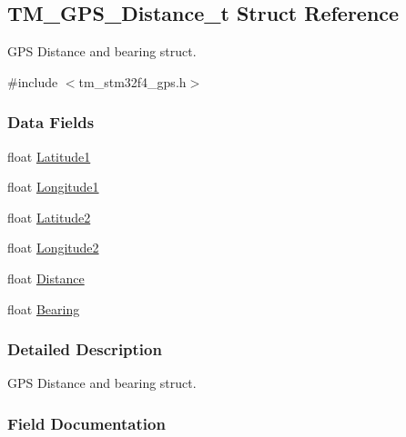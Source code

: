\hypertarget{struct_t_m___g_p_s___distance__t}{}\subsection{T\+M\+\_\+\+G\+P\+S\+\_\+\+Distance\+\_\+t Struct Reference}
\label{struct_t_m___g_p_s___distance__t}


G\+P\+S Distance and bearing struct.  




{\ttfamily \#include $<$tm\+\_\+stm32f4\+\_\+gps.\+h$>$}

\subsubsection*{Data Fields}
\begin{DoxyCompactItemize}
\item 
float \hyperlink{struct_t_m___g_p_s___distance__t_a196ead20874081c54da1766fed562e3b}{Latitude1}
\item 
float \hyperlink{struct_t_m___g_p_s___distance__t_a55cb12186b5e6245fe68de089455b0c0}{Longitude1}
\item 
float \hyperlink{struct_t_m___g_p_s___distance__t_acaa51fcd0573f464d6a97cfba1d01afd}{Latitude2}
\item 
float \hyperlink{struct_t_m___g_p_s___distance__t_a29d2767e579abe2cd00827c7352a2999}{Longitude2}
\item 
float \hyperlink{struct_t_m___g_p_s___distance__t_ad387fb71b61baf6ce35cb7c4d5c16b17}{Distance}
\item 
float \hyperlink{struct_t_m___g_p_s___distance__t_aaad219b651c465ea6fac97c44ac074a2}{Bearing}
\end{DoxyCompactItemize}


\subsubsection{Detailed Description}
G\+P\+S Distance and bearing struct. 

\subsubsection{Field Documentation}
\hypertarget{struct_t_m___g_p_s___distance__t_aaad219b651c465ea6fac97c44ac074a2}{}
